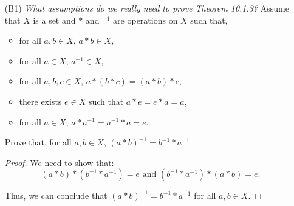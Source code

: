 \documentclass{article}
\begin{document}
\begin{itemize}
	\item [(B1)] \emph{What assumptions do we really need to prove Theorem 10.1.3?}  Assume that $X$ is a set and $*$ and ${}^{\minus1}$ are operations on $X$ such that,
		\begin{itemize}
			\item for all $a, b \in X$, $a * b \in X$,
			\item for all $a \in X$, $a^{\minus1} \in X$,
			\item for all $a, b, c \in X$, $a * (b * c) = (a * b) * c$,
			\item there exists $e \in X$ such that $a * e = e * a = a$,
			\item for all $a \in X$, $a * a^{\minus1} = a^{\minus1} * a = e$.
		\end{itemize}
        Prove that, for all $a, b \in X$, $(a * b)^{-1} = b^{-1} * a^{-1}$.
            \begin{proof}
                We need to show that:
                    \[
                    (a * b) * (b^{\minus1} * a^{\minus1}) = e \text{ and } 
                    (b^{\minus1} * a^{\minus1}) * (a * b) = e.
                    \]
                \begin{caseof}
                \end{caseof}
                Thus, we can conclude that $(a * b)^{-1} = b^{-1} * a^{-1}$ for all $a, b \in X$.
            \end{proof}


\end{itemize}
\end{document}
